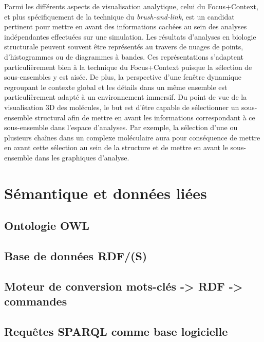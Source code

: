 Parmi les différents aspects de visualisation analytique, celui du Focus+Context, et plus spécifiquement de la technique du \textit{brush-and-link}, est un candidat pertinent pour mettre en avant des informations cachées au sein des analyses indépendantes effectuées sur une simulation. Les résultats d'analyses en biologie structurale peuvent souvent être représentés au travers de nuages de points, d'histogrammes ou de diagrammes à bandes. Ces représentations s'adaptent particulièrement bien à la technique du Focus+Context puisque la sélection de sous-ensembles y est aisée. De plus, la perspective d'une fenêtre dynamique regroupant le contexte global et les détails dans un même ensemble est particulièrement adapté à un environnement immersif.
Du point de vue de la visualisation 3D des molécules, le but est d'être capable de sélectionner un sous-ensemble structural afin de mettre en avant les informations correspondant à ce sous-ensemble dans l'espace d'analyses. Par exemple, la sélection d'une ou plusieurs chaînes dans un complexe moléculaire aura pour conséquence de mettre en avant cette sélection au sein de la structure et de mettre en avant le sous-ensemble dans les graphiques d'analyse.





\section{Sémantique et données liées}

\subsection{Ontologie OWL}

\subsection{Base de données RDF/(S)}

\subsection{Moteur de conversion mots-clés -> RDF -> commandes}

\subsection{Requêtes SPARQL comme base logicielle}

